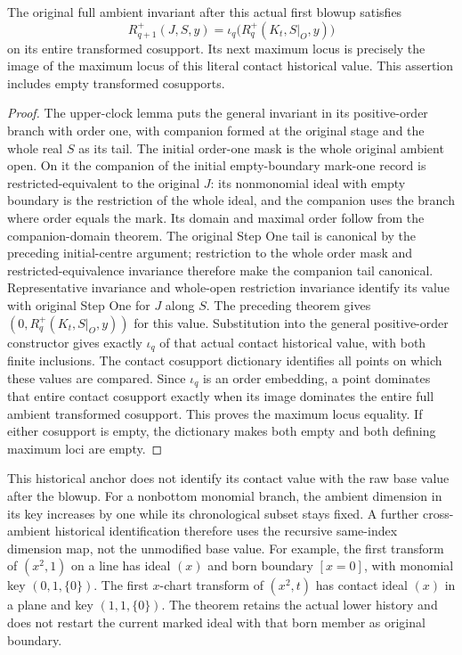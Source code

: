 \begin{theorem}
\label{hir:disjoint-first-step-full-historical-anchor}
\leanok
The original full ambient invariant after this actual first blowup satisfies
\[
 R^+_{q+1}(J,S,y)=\iota_q\bigl(R_q^+(K_t,S|_O,y)\bigr)
\]
on its entire transformed cosupport. Its next maximum locus is precisely
the image of the maximum locus of this literal contact historical value.
This assertion includes empty transformed cosupports.
\end{theorem}
\begin{proof}
The upper-clock lemma puts the general invariant in its positive-order
branch with order one, with companion formed at the original stage and
the whole real $S$ as its tail. The initial order-one mask is the whole
original ambient open. On it the companion of the initial empty-boundary
mark-one record is restricted-equivalent to the original $J$: its
nonmonomial ideal with empty boundary is the restriction of the whole ideal,
and the companion uses the branch where order equals the mark. Its domain
and maximal order follow from the companion-domain theorem. The original
Step One tail is canonical by the preceding initial-centre argument;
restriction to the whole order mask and restricted-equivalence invariance
therefore make the companion tail canonical. Representative invariance and whole-open
restriction invariance identify its value with original Step One for $J$
along $S$. The preceding theorem gives $(0,R_q^+(K_t,S|_O,y))$ for this value.
Substitution into the general positive-order constructor gives exactly
$\iota_q$ of that actual contact historical value, with both finite
inclusions. The contact cosupport dictionary identifies all points on which
these values are compared. Since $\iota_q$ is an order embedding, a point
dominates that entire contact cosupport exactly when its image dominates
the entire full ambient transformed cosupport. This proves the maximum
locus equality. If either cosupport is empty, the dictionary makes both
empty and both defining maximum loci are empty.
\end{proof}

\begin{remark}
This historical anchor does not identify its contact value with the raw
base value after the blowup. For a nonbottom monomial branch, the ambient
dimension in its key increases by one while its chronological subset stays
fixed. A further cross-ambient historical identification therefore uses
the recursive same-index dimension map, not the unmodified base value.
For example, the first transform of $(x^2,1)$ on a line has ideal $(x)$ and
born boundary $[x=0]$, with monomial key $(0,1,\{0\})$. The first $x$-chart
transform of $(x^2,t)$ has contact ideal $(x)$ in a plane and key
$(1,1,\{0\})$. The theorem retains the actual lower history and does not
restart the current marked ideal with that born member as original boundary.
\end{remark}
